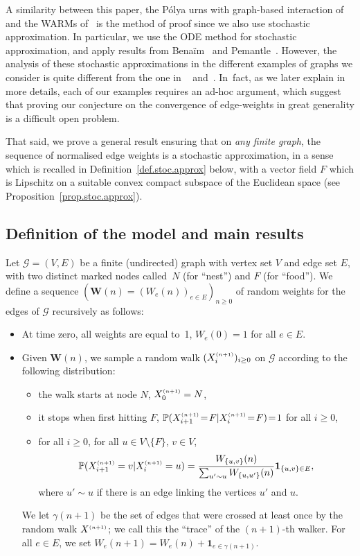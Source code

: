 \documentclass[10pt]{amsart}
\let\mathcal\mathscr
\newcommand{\bW}{\boldsymbol{W}}
\numberwithin{equation}{section}
\theoremstyle{definition}
\let\bs\boldsymbol
\newcommand{\sss}{\ensuremath{\scriptscriptstyle}}
\begin{document}
A similarity between this paper, the Pólya urns with graph-based interaction of~\cite{BBCL}
and the WARMs of~\cite{WARM} is the method of proof since
we also use stochastic approximation.
In particular, we use the ODE method for stochastic approx\-imation, and apply results from Benaïm~\cite{Benaim} and Pemantle~\cite{Pemantle}.
However, the analysis of these stochastic approximations in the different examples of graphs we consider is quite different from the one in ~\cite{BBCL} and~\cite{WARM}.
In~fact, as we later explain in more details,
each of our examples requires an ad-hoc argument,
which suggest that proving our conjecture on the convergence of edge-weights in great generality is a difficult open problem.

That said, we prove a general result ensuring that on \emph{any finite graph}, the sequence of normalised edge weights is a stochastic approximation, in a sense which is recalled in Definition~\ref{def.stoc.approx} below, with a vector field $F$ which is Lipschitz on a suitable convex compact subspace of the Euclidean space (see Proposition~\ref{prop.stoc.approx}).

\subsection{Definition of the model and main results}
Let $\mathcal G\!=\!(V,E)$ be a \hbox{finite} (undirected) graph with vertex set $V$ and edge set $E$,
with two distinct marked nodes called~$N$ (for ``nest'') and $F$ (for ``food'').
We define a sequence $(\bW(n)\!=\!(W_e(n))_{e\in E})_{n\geq 0}$ of random weights for the edges of $\mathcal G$ recursively as follows:
\begin{itemize}
\item At time zero, all weights are equal to~1, \ie $W_e(0) = 1$ for all $e\in E$.
\item Given $\bW(n)$, we sample a random walk $(X^{\sss (n+1)}_i)_{i\geq 0}$
on $\mathcal G$ according to the following distribution:
\begin{itemize}
\item the walk starts at node $N$, \ie $X_0^{\sss (n+1)} = N$,
\item it stops when first hitting $F$, \ie $\mathbb P(X^{\sss (n+1)}_{i+1}\!=\!F | X^{\sss (n+1)}_{i}\!=\!F)\!=\!1$ for all $i\!\geq\!0$,
\item for all $i\geq 0$, for all {$u\in V\setminus\{F\}$}, $v\in V$,
\[
\mathbb P(X^{\sss (n+1)}_{i+1} = v | X^{\sss (n+1)}_{i}=u) = \frac{W_{\{u,v\}}(n)}{\sum_{u'\sim u}W_{\{u,u'\}}(n)} \bs 1_{\{u,v\}\in E},
\]
where $u'\sim u$ if there is an edge linking the vertices $u'$ and $u$.
\end{itemize}
We let $\gamma(n+1)$ be the set of edges that were crossed at least once
by the random walk $X^{\sss (n+1)}$; we call this the ``trace'' of the $(n+1)$-th walker.
For all $e\in E$, we set $W_e(n+1) = W_e(n)+\bs 1_{e\in \gamma(n+1)}$.
\end{itemize}
\end{document}
